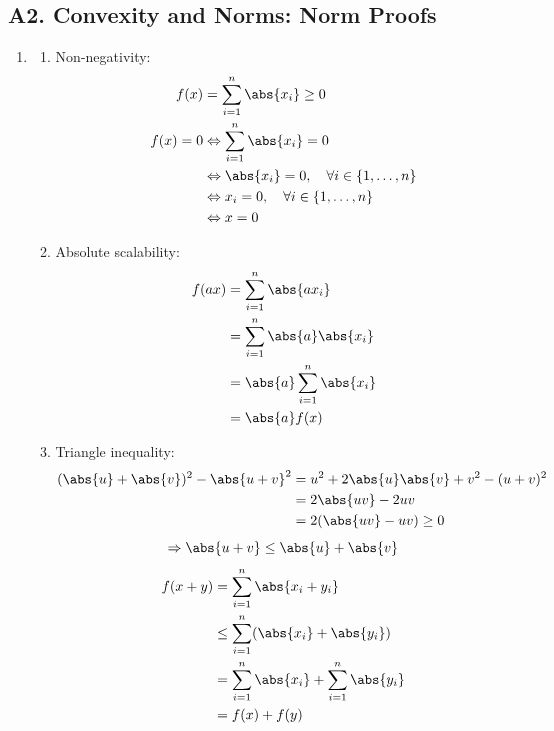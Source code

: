 \documentclass[fleqn]{article}
\begin{document}

\subsection*{A2. Convexity and Norms: Norm Proofs}

\begin{enumerate}[label=(\alph*)]
\item
\begin{enumerate}[label=(\roman*)]
\item Non-negativity:
\begin{align*}
f(x) &= \sum_{i=1}^{n}\abs{x_i} \geq 0 \\
f(x) = 0
&\Leftrightarrow \sum_{i=1}^{n}\abs{x_i} = 0 \\
&\Leftrightarrow \abs{x_i} = 0,\quad \forall i \in \{1,\dots,n\} \\
&\Leftrightarrow x_i = 0,\quad \forall i \in \{1,\dots,n\} \\
&\Leftrightarrow x = 0
\end{align*}

\item Absolute scalability:
\begin{align*}
f(ax)
&= \sum_{i=1}^{n}\abs{a x_i} \\
&= \sum_{i=1}^{n}\abs{a}\abs{x_i} \\
&= \abs{a}\sum_{i=1}^{n}\abs{x_i} \\
&= \abs{a}f(x)
\end{align*}

\item Triangle inequality:
\begin{align*}
(\abs{u}+\abs{v})^2-\abs{u+v}^2
&= u^2 + 2\abs{u}\abs{v} + v^2 - (u+v)^2 \\
&= 2\abs{uv} - 2uv \\
&= 2(\abs{uv} - uv) \geq 0
\end{align*}
\[
\Rightarrow \abs{u+v} \leq \abs{u}+\abs{v}
\]
\begin{align*}
f(x+y)
&= \sum_{i=1}^{n}\abs{x_i+y_i} \\
&\leq \sum_{i=1}^{n}(\abs{x_i}+\abs{y_i}) \\
&= \sum_{i=1}^{n}\abs{x_i}+\sum_{i=1}^{n}\abs{y_i} \\
&= f(x)+f(y)
\end{align*}
\end{enumerate}


\end{enumerate}
\end{document}
